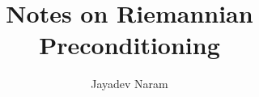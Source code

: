 \documentclass[11pt,a4paper]{article}
\author{Jayadev Naram}
\title{Notes on Riemannian Preconditioning}
\begin{document}
\date{}
\maketitle
\tableofcontents
\newpage

\theoremstyle{plain}
\newtheorem{theorem}{Theorem}[section]
\newtheorem{corollary}[theorem]{Corollary}
\newtheorem{lemma}[theorem]{Lemma}
\newtheorem{proposition}[theorem]{Proposition}
\newtheorem{remark}[theorem]{Remark}
\newtheorem{example}[theorem]{Example}
\newtheorem{assume}{Assumption}

\theoremstyle{definition}
\newtheorem{definition}[theorem]{Definition}


\newcommand{\R}{\mathbb{R}}
\newcommand{\A}{\mathcal{A}}
\newcommand{\M}{\mathcal{M}}
\newcommand{\N}{\mathcal{N}}
\newcommand{\T}{\mathcal{T}}
\newcommand{\Proj}{\mathcal{P}}
\newcommand{\perpProj}{\mathcal{P}^\perp}
\newcommand{\bb}{\mathbb{B}}
\newcommand{\Sprod}{\mathbb{S}_{xy}}
\newcommand{\highlight}[1]{\textsl{\textbf{#1}}}
\newcommand{\mapping}[3]{#1:#2\rightarrow #3}
\newcommand{\doubt}{\highlight{[??]}}
\newcommand{\bigvert}[2]{\left.#1\right|_{#2}}
\newcommand{\sdnn}[1]{${#1}$}
\newcommand{\bsdnn}[1]{$\boldsymbol{#1}$}
\newcommand{\ifthen}[2]{\textbf{(#1)}\boldsymbol{\implies}\textbf{(#2)}}
\newcommand{\bsdn}[1]{\boldsymbol{#1}}
\newcommand{\forward}{$(\implies)$}
\newcommand{\converse}{$(\impliedby)$}
\newcommand{\Lt}[1]{\underset{#1\rightarrow 0}{Lt}}
\newcommand{\norm}[1]{\|#1\|}
\newcommand{\dparder}[2]{\dfrac{\partial #1}{\partial x_{#2}}}
\newcommand{\fparder}[2]{\frac{\partial #1}{\partial x_{#2}}}
\newcommand{\parder}[2]{\partial #1/\partial x_{#2}}
\newcommand{\parop}[1]{\dfrac{\partial}{\partial x_{#1}}}
\newcommand{\innerproduct}[2]{\langle #1, #2 \rangle}
\newcommand{\genst}{St_B(n,p)}
\newcommand{\igenst}[1]{St_{B_{#1}}(n_{#1},p)}
\newcommand{\realmat}[2]{\R^{#1\times #2}}
\newcommand{\Skew}{\mathcal{S}_{skew}(p)}
\newcommand{\Sym}{\mathcal{S}_{sym}(p)}
\newcommand{\XperpB}{X_{B^\perp}}
\newcommand{\polarRetr}{R^{polar}_X}
\newcommand{\qrRetr}{R^{QR}_X}
\newcommand{\vectransport}{\mathcal{T}}
\newcommand{\grad}{\text{grad}\,}
\newcommand{\hess}{\text{Hess}\,}
\newcommand{\lift}{\text{lift}}
\end{document}

